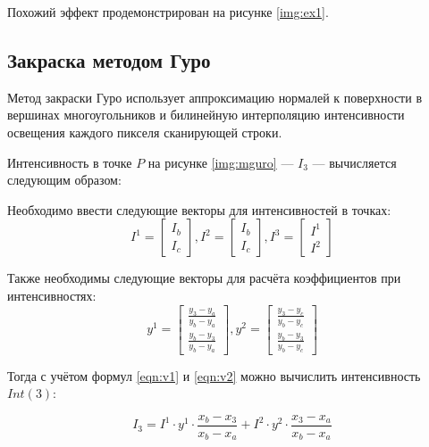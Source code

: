 \begin{enumerate}
Похожий эффект продемонстрирован на рисунке \ref{img:ex1}.

 \pagebreak

\subsection{Закраска методом Гуро}

Метод закраски Гуро использует аппроксимацию нормалей к поверхности в вершинах многоугольников и билинейную интерполяцию интенсивности освещения каждого пикселя сканирующей строки. 

Интенсивность в точке $P$ на рисунке \ref{img:mguro} --- $I_3$ --- вычисляется следующим образом:


 
Необходимо ввести следующие векторы для интенсивностей в точках:
\begin{equation}
	\label{eqn:v1} 
	I^1 = 
	\begin{bmatrix}
		I_b \\
		I_c
	\end{bmatrix},
	I^2 = \begin{bmatrix}
		I_b \\
		I_c
	\end{bmatrix},
	I^3 = \begin{bmatrix}
		I^1\\
		I^2
	\end{bmatrix}
\end{equation}

Также необходимы следующие векторы для расчёта коэффициентов при интенсивностях:
\begin{equation}
	\label{eqn:v2}
	y^1 = \begin{bmatrix}
		\frac{y_3-y_a}{y_b-y_a}\\
		\frac{y_b-y_3}{y_b-y_a}
	\end{bmatrix},
	y^2 = \begin{bmatrix}
		\frac{y_3-y_c}{y_b-y_c}\\
		\frac{y_b-y_3}{y_b-y_c}
	\end{bmatrix}
\end{equation}

Тогда с учётом формул \ref{eqn:v1} и \ref{eqn:v2} можно вычислить интенсивность $Int(3)$:

\begin{equation}
	I_3 = I^1\cdot y^1 \cdot \frac{x_b-x_3}{x_b-x_a} + I^2\cdot y^2 \cdot \frac{x_3-x_a}{x_b-x_a}
\end{equation}


\end{enumerate}

